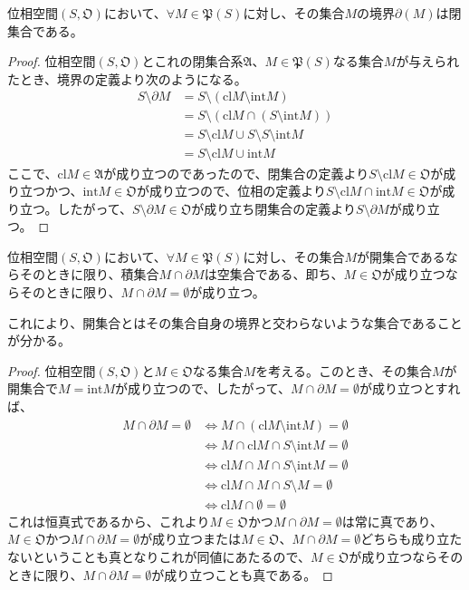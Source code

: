 \documentclass[dvipdfmx]{jsarticle}
\begin{document}
\begin{thm}\label{8.1.1.17}
位相空間$\left( S,\mathfrak{O} \right)$において、$\forall M \in \mathfrak{P}(S)$に対し、その集合$M$の境界$\partial(M)$は閉集合である。
\end{thm}
\begin{proof}
位相空間$\left( S,\mathfrak{O} \right)$とこれの閉集合系$\mathfrak{A}$、$M \in \mathfrak{P}(S)$なる集合$M$が与えられたとき、境界の定義より次のようになる。
\begin{align*}
S \setminus \partial M &= S \setminus \left( {\mathrm{cl}}M \setminus {\mathrm{int}}M \right)\\
&= S \setminus \left( {\mathrm{cl}}M \cap \left( S \setminus {\mathrm{int}}M \right) \right)\\
&= S \setminus {\mathrm{cl}}M \cup S \setminus S \setminus {\mathrm{int}}M\\
&= S \setminus {\mathrm{cl}}M \cup {\mathrm{int}}M
\end{align*}
ここで、${\mathrm{cl}}M\in \mathfrak{A}$が成り立つのであったので、閉集合の定義より$S \setminus {\mathrm{cl}}M\in \mathfrak{O}$が成り立つかつ、${\mathrm{int}}M\in \mathfrak{O}$が成り立つので、位相の定義より$S \setminus {\mathrm{cl}}M \cap {\mathrm{int}}M\in \mathfrak{O}$が成り立つ。したがって、$S \setminus \partial M \in \mathfrak{O}$が成り立ち閉集合の定義より$S \setminus \partial M$が成り立つ。
\end{proof}
\begin{thm}\label{8.1.1.18}
位相空間$\left( S,\mathfrak{O} \right)$において、$\forall M \in \mathfrak{P}(S)$に対し、その集合$M$が開集合であるならそのときに限り、積集合$M \cap \partial M$は空集合である、即ち、$M \in \mathfrak{O}$が成り立つならそのときに限り、$M \cap \partial M = \emptyset$が成り立つ。\par
これにより、開集合とはその集合自身の境界と交わらないような集合であることが分かる。
\end{thm}
\begin{proof}
位相空間$\left( S,\mathfrak{O} \right)$と$M \in \mathfrak{O}$なる集合$M$を考える。このとき、その集合$M$が開集合で$M = {\mathrm{int}}M$が成り立つので、したがって、$M \cap \partial M = \emptyset$が成り立つとすれば、
\begin{align*}
M \cap \partial M = \emptyset &\Leftrightarrow M \cap \left( {\mathrm{cl}}M \setminus {\mathrm{int}}M \right) = \emptyset\\
&\Leftrightarrow M \cap {\mathrm{cl}}M \cap S \setminus {\mathrm{int}}M = \emptyset\\
&\Leftrightarrow {\mathrm{cl}}M \cap M \cap S \setminus {\mathrm{int}}M = \emptyset\\
&\Leftrightarrow {\mathrm{cl}}M \cap M \cap S \setminus M = \emptyset\\
&\Leftrightarrow {\mathrm{cl}}M \cap \emptyset = \emptyset
\end{align*}
これは恒真式であるから、これより$M \in \mathfrak{O}$かつ$M \cap \partial M = \emptyset$は常に真であり、$M \in \mathfrak{O}$かつ$M \cap \partial M = \emptyset$が成り立つまたは$M \in \mathfrak{O}$、$M \cap \partial M = \emptyset$どちらも成り立たないということも真となりこれが同値にあたるので、$M \in \mathfrak{O}$が成り立つならそのときに限り、$M \cap \partial M = \emptyset$が成り立つことも真である。
\end{proof}
\end{document}
